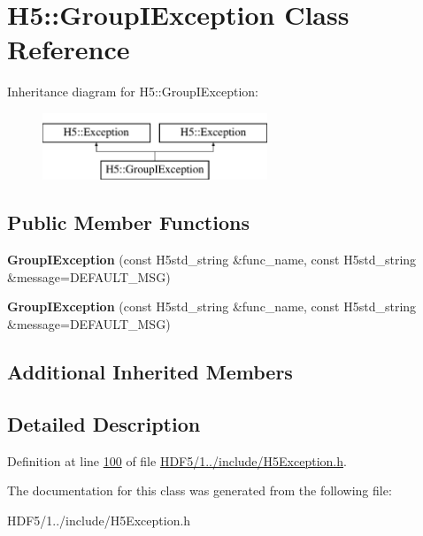 \hypertarget{class_h5_1_1_group_i_exception}{}\section{H5\+:\+:Group\+I\+Exception Class Reference}
\label{class_h5_1_1_group_i_exception}
Inheritance diagram for H5\+:\+:Group\+I\+Exception\+:\begin{figure}[H]
\begin{center}
\leavevmode
\includegraphics[height=2.000000cm]{class_h5_1_1_group_i_exception}
\end{center}
\end{figure}
\subsection*{Public Member Functions}
\begin{DoxyCompactItemize}
\item 
\mbox{\label{class_h5_1_1_group_i_exception_a1cdd4acc8aa7168e2346d83655c282bd}} 
{\bfseries Group\+I\+Exception} (const H5std\+\_\+string \&func\+\_\+name, const H5std\+\_\+string \&message=D\+E\+F\+A\+U\+L\+T\+\_\+\+M\+SG)
\item 
\mbox{\label{class_h5_1_1_group_i_exception_a1cdd4acc8aa7168e2346d83655c282bd}} 
{\bfseries Group\+I\+Exception} (const H5std\+\_\+string \&func\+\_\+name, const H5std\+\_\+string \&message=D\+E\+F\+A\+U\+L\+T\+\_\+\+M\+SG)
\end{DoxyCompactItemize}
\subsection*{Additional Inherited Members}


\subsection{Detailed Description}


Definition at line \hyperlink{_h_d_f5_21_810_81_2include_2_h5_exception_8h_source_l00100}{100} of file \hyperlink{_h_d_f5_21_810_81_2include_2_h5_exception_8h_source}{H\+D\+F5/1../include/\+H5\+Exception.\+h}.



The documentation for this class was generated from the following file\+:\begin{DoxyCompactItemize}
\item 
H\+D\+F5/1../include/\+H5\+Exception.\+h\end{DoxyCompactItemize}
